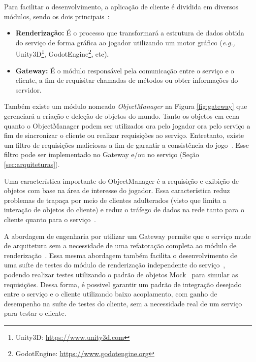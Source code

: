 Para facilitar o desenvolvimento, a aplicação de cliente é dividida em diversos módulos, sendo os dois principais~\cite{albion_online_unite}:



\begin{itemize}
  \item \textbf{Renderização:} É o processo que transformará a estrutura de dados obtida do serviço de forma gráfica ao jogador utilizando um motor gráfico (\textit{e.g.,} Unity3D\footnote{Unity3D: \url{https://www.unity3d.com}}, GodotEngine\footnote{GodotEngine: \url{https://www.godotengine.org}}, etc).
  \item \textbf{Gateway:} É o módulo responsável pela comunicação entre o serviço e o cliente, a fim de requisitar chamadas de métodos ou obter informações do servidor.
\end{itemize}



Também existe um módulo nomeado \textit{ObjectManager} na Figura \ref{fig:gateway} que gerenciará a criação e deleção de objetos do mundo.
%
Tanto os objetos em cena quanto o ObjectManager podem ser utilizados ora pelo jogador ora pelo serviço a fim de sincronizar o cliente ou realizar requisições ao serviço.
%
Entretanto, existe um filtro de requisições maliciosas a fim de garantir a consistência do jogo~\cite{albion_online_unite}.
%
Esse filtro pode ser implementado no Gateway e/ou no serviço (Seção \ref{sec:arquiteturas}).



Uma característica importante do ObjectManager é a requisição e exibição de objetos com base na área de interesse do jogador.
%
Essa característica reduz problemas de trapaça por meio de clientes adulterados (visto que limita a interação de objetos do cliente) e reduz o tráfego de dados na rede tanto para o cliente quanto para o serviço~\cite{albion_online_unite, stephenclarkewillson2017}.



A abordagem de engenharia por utilizar um Gateway permite que o serviço mude de arquitetura sem a necessidade de uma refatoração completa ao módulo de renderização~\cite{albion_online_unite, stephenclarkewillson2017}.
%
Essa mesma abordagem também facilita o desenvolvimento de uma suíte de testes do módulo de renderização independente do serviço~\cite{Freeman2009Oct}, podendo realizar testes utilizando o padrão de objetos Mock~\cite{Beck2004Nov} para simular as requisições.
%
Dessa forma, é possivel garantir um padrão de integração desejado entre o serviço e o cliente utilizando baixo acoplamento, com ganho de desempenho na suíte de testes do cliente, sem a necessidade real de um serviço para testar o cliente.



